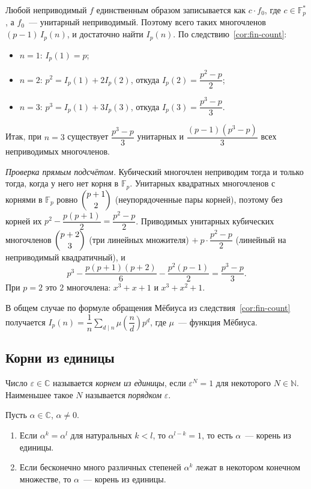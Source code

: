 \documentclass[12pt]{article}
\begin{document}
	\begin{solution}
		Любой неприводимый $f$ единственным образом записывается как $c \cdot f_0$, где $c \in \mathbb{F}_p^*$, а $f_0$~--- унитарный неприводимый. Поэтому всего таких многочленов $(p - 1)\,I_p(n)$, и достаточно найти $I_p(n)$. По следствию~\ref{cor:fin-count}:
		\begin{itemize}
			\item $n = 1$: $I_p(1) = p$;
			\item $n = 2$: $p^2 = I_p(1) + 2I_p(2)$, откуда $I_p(2) = \dfrac{p^2 - p}{2}$;
			\item $n = 3$: $p^3 = I_p(1) + 3I_p(3)$, откуда $I_p(3) = \dfrac{p^3 - p}{3}$.
		\end{itemize}
		Итак, при $n = 3$ существует $\dfrac{p^3 - p}{3}$ унитарных и $\dfrac{(p-1)(p^3 - p)}{3}$ всех неприводимых многочленов.

		\emph{Проверка прямым подсчётом.} Кубический многочлен неприводим тогда и только тогда, когда у него нет корня в $\mathbb{F}_p$. Унитарных квадратных многочленов с корнями в $\mathbb{F}_p$ ровно $\dbinom{p+1}{2}$ (неупорядоченные пары корней), поэтому без корней их $p^2 - \dfrac{p(p+1)}{2} = \dfrac{p^2 - p}{2}$. Приводимых унитарных кубических многочленов $\dbinom{p+2}{3}$ (три линейных множителя) $+\ p \cdot \dfrac{p^2 - p}{2}$ (линейный на неприводимый квадратичный), и
		\[
			p^3 - \dfrac{p(p+1)(p+2)}{6} - \dfrac{p^2(p-1)}{2} = \dfrac{p^3 - p}{3}.
		\]
		При $p = 2$ это $2$ многочлена: $x^3 + x + 1$ и $x^3 + x^2 + 1$.
	\end{solution}

	\begin{note}
		В общем случае по формуле обращения Мёбиуса из следствия~\ref{cor:fin-count} получается $I_p(n) = \dfrac{1}{n}\sum_{d \mid n} \mu\!\left(\dfrac{n}{d}\right) p^d$, где $\mu$~--- функция Мёбиуса.
	\end{note}

	\subsection{Корни из единицы}

	\begin{definition}
		Число $\varepsilon \in \mathbb{C}$ называется \emph{корнем из единицы}, если $\varepsilon^N = 1$ для некоторого $N \in \mathbb{N}$. Наименьшее такое $N$ называется \emph{порядком} $\varepsilon$.
	\end{definition}

	\begin{lemma}\label{lem:power-repeat}
		Пусть $\alpha \in \mathbb{C}$, $\alpha \ne 0$.
		\begin{enumerate}
			\item Если $\alpha^k = \alpha^l$ для натуральных $k < l$, то $\alpha^{l - k} = 1$, то есть $\alpha$~--- корень из единицы.
			\item Если бесконечно много различных степеней $\alpha^{k}$ лежат в некотором конечном множестве, то $\alpha$~--- корень из единицы.
		\end{enumerate}
	\end{lemma}
\end{document}
